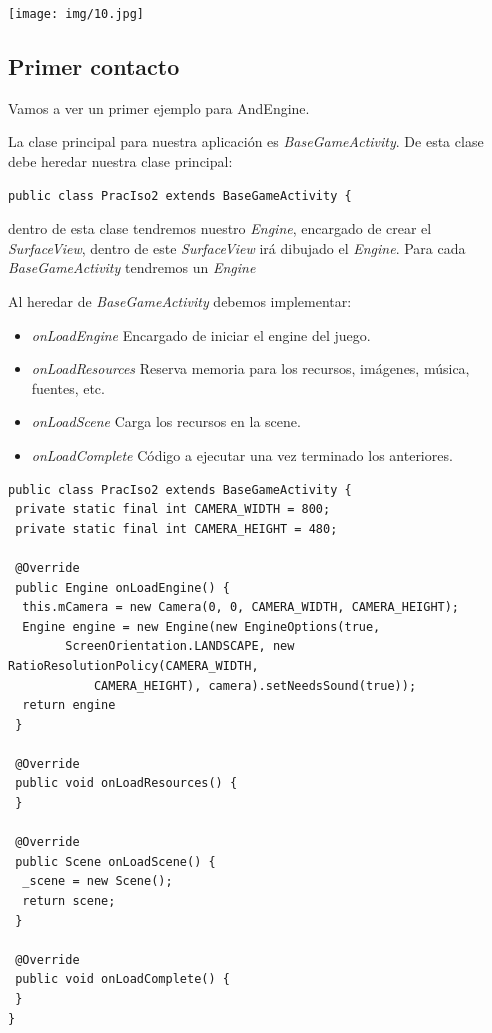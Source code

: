 \documentclass[12 pt, a4paper, twoside]{article}
\begin{document}
\begin{center}
  \texttt{[image: img/10.jpg]}
\end{center}

\clearpage
\subsection{Primer contacto}
Vamos a ver un primer ejemplo para AndEngine.

La clase principal para nuestra aplicación es
\emph{BaseGameActivity}. De esta clase debe heredar nuestra clase principal:

\begin{verbatim}
public class PracIso2 extends BaseGameActivity {
\end{verbatim}

dentro de esta clase tendremos nuestro \emph{Engine}, encargado de
crear el \emph{SurfaceView}, dentro de este \emph{SurfaceView} irá
dibujado el \emph{Engine}. Para cada \emph{BaseGameActivity} tendremos
un \emph{Engine}

Al heredar de \emph{BaseGameActivity} debemos implementar:

\begin{itemize}
\item \emph{onLoadEngine} Encargado de iniciar el engine del juego.
\item \emph{onLoadResources} Reserva memoria para los recursos, imágenes, música,
  fuentes, etc.
\item \emph{onLoadScene} Carga los recursos en la scene.
\item \emph{onLoadComplete} Código a ejecutar una vez terminado los anteriores.
\end{itemize}
{\tiny
\begin{verbatim}
public class PracIso2 extends BaseGameActivity {
 private static final int CAMERA_WIDTH = 800;
 private static final int CAMERA_HEIGHT = 480;

 @Override
 public Engine onLoadEngine() {
  this.mCamera = new Camera(0, 0, CAMERA_WIDTH, CAMERA_HEIGHT);
  Engine engine = new Engine(new EngineOptions(true,
        ScreenOrientation.LANDSCAPE, new RatioResolutionPolicy(CAMERA_WIDTH,
            CAMERA_HEIGHT), camera).setNeedsSound(true));
  return engine
 }

 @Override
 public void onLoadResources() {
 }

 @Override
 public Scene onLoadScene() {
  _scene = new Scene();
  return scene;
 }

 @Override
 public void onLoadComplete() {
 }
}

\end{verbatim}
}
\end{document}
